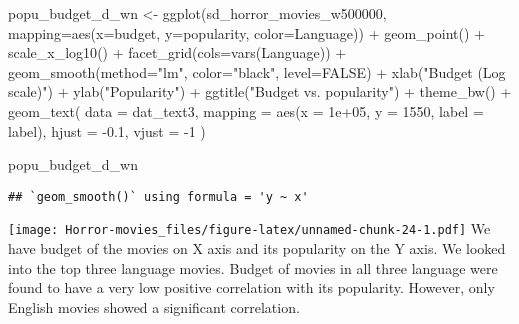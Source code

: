 \documentclass[
]{article}
\newenvironment{Shaded}{\begin{snugshade}}{\end{snugshade}}
\newcommand{\AttributeTok}[1]{\textcolor[rgb]{0.77,0.63,0.00}{#1}}
\newcommand{\ConstantTok}[1]{\textcolor[rgb]{0.00,0.00,0.00}{#1}}
\newcommand{\DecValTok}[1]{\textcolor[rgb]{0.00,0.00,0.81}{#1}}
\newcommand{\FloatTok}[1]{\textcolor[rgb]{0.00,0.00,0.81}{#1}}
\newcommand{\FunctionTok}[1]{\textcolor[rgb]{0.00,0.00,0.00}{#1}}
\newcommand{\NormalTok}[1]{#1}
\newcommand{\OtherTok}[1]{\textcolor[rgb]{0.56,0.35,0.01}{#1}}
\newcommand{\SpecialCharTok}[1]{\textcolor[rgb]{0.00,0.00,0.00}{#1}}
\newcommand{\StringTok}[1]{\textcolor[rgb]{0.31,0.60,0.02}{#1}}
\begin{document}
\begin{Shaded}
\begin{Highlighting}[]
\NormalTok{popu\_budget\_d\_wn }\OtherTok{\textless{}{-}} \FunctionTok{ggplot}\NormalTok{(sd\_horror\_movies\_w500000, }\AttributeTok{mapping=}\FunctionTok{aes}\NormalTok{(}\AttributeTok{x=}\NormalTok{budget, }\AttributeTok{y=}\NormalTok{popularity, }\AttributeTok{color=}\NormalTok{Language)) }\SpecialCharTok{+} \FunctionTok{geom\_point}\NormalTok{() }\SpecialCharTok{+} \FunctionTok{scale\_x\_log10}\NormalTok{() }\SpecialCharTok{+} \FunctionTok{facet\_grid}\NormalTok{(}\AttributeTok{cols=}\FunctionTok{vars}\NormalTok{(Language)) }\SpecialCharTok{+} \FunctionTok{geom\_smooth}\NormalTok{(}\AttributeTok{method=}\StringTok{"lm"}\NormalTok{, }\AttributeTok{color=}\StringTok{"black"}\NormalTok{, }\AttributeTok{level=}\ConstantTok{FALSE}\NormalTok{) }\SpecialCharTok{+} \FunctionTok{xlab}\NormalTok{(}\StringTok{"Budget (Log scale)"}\NormalTok{) }\SpecialCharTok{+} \FunctionTok{ylab}\NormalTok{(}\StringTok{"Popularity"}\NormalTok{) }\SpecialCharTok{+} \FunctionTok{ggtitle}\NormalTok{(}\StringTok{"Budget vs. popularity"}\NormalTok{) }\SpecialCharTok{+} \FunctionTok{theme\_bw}\NormalTok{() }\SpecialCharTok{+} \FunctionTok{geom\_text}\NormalTok{(}
  \AttributeTok{data    =}\NormalTok{ dat\_text3,}
  \AttributeTok{mapping =} \FunctionTok{aes}\NormalTok{(}\AttributeTok{x =} \FloatTok{1e+05}\NormalTok{, }\AttributeTok{y =} \DecValTok{1550}\NormalTok{, }\AttributeTok{label =}\NormalTok{ label),}
  \AttributeTok{hjust   =} \SpecialCharTok{{-}}\FloatTok{0.1}\NormalTok{,}
  \AttributeTok{vjust   =} \SpecialCharTok{{-}}\DecValTok{1}
\NormalTok{)}

\NormalTok{popu\_budget\_d\_wn}
\end{Highlighting}
\end{Shaded}

\begin{verbatim}
## `geom_smooth()` using formula = 'y ~ x'
\end{verbatim}

\texttt{[image: Horror-movies\_files/figure-latex/unnamed-chunk-24-1.pdf]}
We have budget of the movies on X axis and its popularity on the Y axis.
We looked into the top three language movies. Budget of movies in all
three language were found to have a very low positive correlation with
its popularity. However, only English movies showed a significant
correlation.
\end{document}
